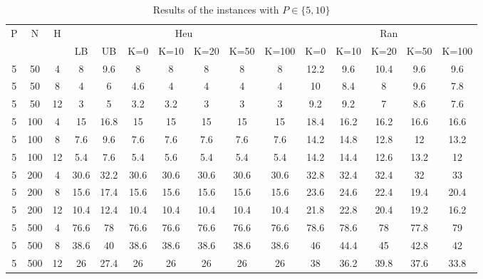 \documentclass[review,3p,times,authoryear,12pt]{elsarticle}
\begin{document}
\begin{table}[!htbp]
\small
  \centering
  \setlength{\belowcaptionskip}{10pt}
  \caption{Results of the instances with $P\in\{5, 10\}$}
  \begin{tabular}{ccccccccccccccc}
  \hline
  \multicolumn{1}{c}{\multirow{2}{*}{P}}
  & \multicolumn{1}{c}{\multirow{2}{*}{N}}
  & \multicolumn{1}{c}{\multirow{2}{*}{H}}
  & \multicolumn{7}{c}{Heu}
  & \multicolumn{5}{c}{Ran}\\
  \cline{4-15}
  \multicolumn{1}{c}{}
  &\multicolumn{1}{c}{}
  &\multicolumn{1}{c}{}
  &\multicolumn{1}{c}{LB}&{UB}&{K=0}&{K=10}&{K=20}&{K=50}&{K=100}
  &\multicolumn{1}{c}{K=0}&{K=10}&{K=20}&{K=50}&{K=100}\\
  \hline

    5     & 50    & 4     & 8     & 9.6   & 8     & 8     & 8     & 8     & 8     & 12.2  & 9.6   & 10.4  & 9.6   & 9.6 \\
    5     & 50    & 8     & 4     & 6     & 4.6   & 4     & 4     & 4     & 4     & 10    & 8.4   & 8     & 9.6   & 7.8 \\
    5     & 50    & 12    & 3     & 5     & 3.2   & 3.2   & 3     & 3     & 3     & 9.2   & 9.2   & 7     & 8.6   & 7.6 \\
    5     & 100   & 4     & 15    & 16.8  & 15    & 15    & 15    & 15    & 15    & 18.4  & 16.2  & 16.2  & 16.6  & 16.6 \\
    5     & 100   & 8     & 7.6   & 9.6   & 7.6   & 7.6   & 7.6   & 7.6   & 7.6   & 14.2  & 14.8  & 12.8  & 12    & 13.2 \\
    5     & 100   & 12    & 5.4   & 7.6   & 5.4   & 5.6   & 5.4   & 5.4   & 5.4   & 14.2  & 14.4  & 12.6  & 13.2  & 12 \\
    5     & 200   & 4     & 30.6  & 32.2  & 30.6  & 30.6  & 30.6  & 30.6  & 30.6  & 32.8  & 32.4  & 32.4  & 32    & 33 \\
    5     & 200   & 8     & 15.6  & 17.4  & 15.6  & 15.6  & 15.6  & 15.6  & 15.6  & 23.6  & 24.6  & 22.4  & 19.4  & 20.4 \\
    5     & 200   & 12    & 10.4  & 12.4  & 10.4  & 10.4  & 10.4  & 10.4  & 10.4  & 21.8  & 22.8  & 20.4  & 19.2  & 16.2 \\
    5     & 500   & 4     & 76.6  & 78    & 76.6  & 76.6  & 76.6  & 76.6  & 76.6  & 78.6  & 78.6  & 78    & 77.8  & 79 \\
    5     & 500   & 8     & 38.6  & 40    & 38.6  & 38.6  & 38.6  & 38.6  & 38.6  & 46    & 44.4  & 45    & 42.8  & 42 \\
    5     & 500   & 12    & 26    & 27.4  & 26    & 26    & 26    & 26    & 26    & 38    & 36.2  & 39.8  & 37.6  & 33.8 \\

\end{tabular}
\end{table}
\end{document}
